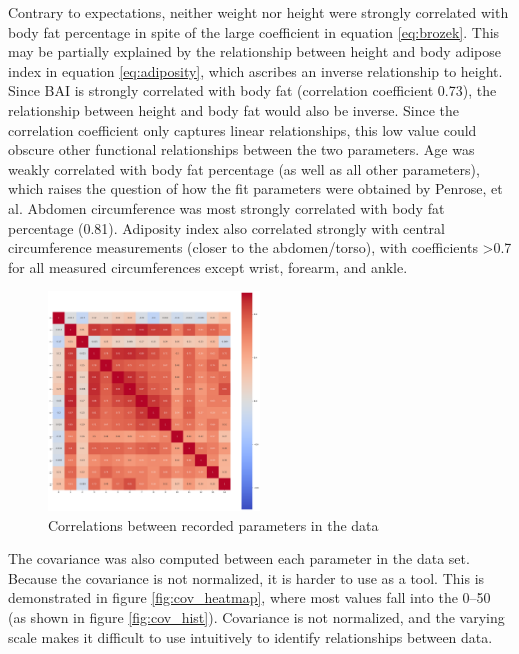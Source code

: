 \documentclass{IEEEtran}
\begin{document}
Contrary to expectations, neither weight nor height were strongly correlated with body fat percentage in spite of the large coefficient in equation \ref{eq:brozek}. This may be partially explained by the relationship between height and body adipose index in equation \ref{eq:adiposity}, which ascribes an inverse relationship to height. Since BAI is strongly correlated with body fat (correlation coefficient \num{0.73}), the relationship between height and body fat would also be inverse. Since the correlation coefficient only captures linear relationships, this low value could obscure other functional relationships between the two parameters. Age was weakly correlated with body fat percentage (as well as all other parameters), which raises the question of how the fit parameters were obtained by Penrose, et al. Abdomen circumference was most strongly correlated with body fat percentage (\num{0.81}). Adiposity index also correlated strongly with central circumference measurements (closer to the abdomen/torso), with coefficients \textgreater\num{0.7} for all measured circumferences except wrist, forearm, and ankle.

\begin{centering}
\begin{figure}
\centering
\begin{center}
	\includegraphics[width=0.5\textwidth]{correlation_heatmap}
	\caption{Correlations between recorded parameters in the data\label{fig:heatmap}}
\end{center}
\end{figure}
\end{centering}

The covariance was also computed between each parameter in the data set. Because the covariance is not normalized, it is harder to use as a tool. This is demonstrated in figure \ref{fig:cov_heatmap}, where most values fall into the \numrange{0}{50} (as shown in figure \ref{fig:cov_hist}). Covariance is not normalized, and the varying scale makes it difficult to use intuitively to identify relationships between data.
\end{document}
